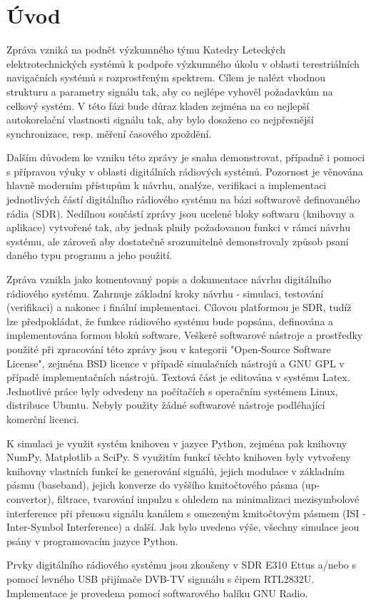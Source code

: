 \section{Úvod}


\marginpar{\textcolor{txt_blue}{Hlavní cíl zprávy}} 
Zpráva vzniká na podnět výzkumného týmu Katedry Leteckých elektrotechnických systémů k podpoře výzkumného úkolu v oblasti terestriálních navigačních systémů s rozprostřeným spektrem. Cílem je nalézt vhodnou strukturu a parametry signálu tak, aby co nejlépe vyhověl požadavkům na celkový systém. V této fázi bude důraz kladen zejména na co nejlepší autokorelační vlastnosti signálu tak, aby bylo dosaženo co nejpřesnější synchronizace, resp. měření časového zpoždění.

\marginpar{\textcolor{txt_blue}{Sekundární cíl zprávy}} 
Dalším důvodem ke vzniku této zprávy je snaha demonstrovat, případně i pomoci s přípravou výuky v oblasti digitálních rádiových systémů. Pozornost je věnována hlavně moderním přístupům k návrhu, analýze, verifikaci a implementaci jednotlivých částí digitálního rádiového systému na bázi softwarově definovaného rádia (SDR). Nedílnou součástí zprávy jsou ucelené bloky softwaru (knihovny a aplikace) vytvořené tak, aby jednak plnily požadovanou funkci v rámci návrhu systému, ale zároveň aby dostatečně srozumitelně demonstrovaly způsob psaní daného typu programu a jeho použití. 

\marginpar{\textcolor{txt_blue}{Použité prostředky}} 
Zpráva vznikla jako komentovaný popis a dokumentace návrhu digitálního rádiového systému. Zahrnuje základní kroky návrhu - simulaci, testování (verifikaci) a nakonec i finální implementaci. Cílovou platformou je SDR, tudíž lze předpokládat, že funkce rádiového systému bude popsána, definována a implementována formou bloků software. Veškeré softwarové nástroje a prostředky použité při zpracování této zprávy jsou v kategorii "Open-Source Software License", zejména BSD licence v případě simulačních nástrojů a GNU GPL v případě implementačních nástrojů. Textová část je editována v systému Latex. Jednotlivé práce byly odvedeny na počítačích s operačním systémem Linux, distribuce Ubuntu. Nebyly použity žádné softwarové nástroje podléhající komerční licenci.

K simulaci je využit systém knihoven v jazyce Python, zejména pak knihovny NumPy, Matplotlib a SciPy. S využitím funkcí těchto knihoven byly vytvořeny knihovny vlastních funkcí ke generování signálů, jejich modulace v základním pásmu (baseband), jejich konverze do vyššího kmitočtového pásma (up-convertor), filtrace, tvarování impulzu s ohledem na minimalizaci mezisymbolové interference při přenosu signálu kanálem s omezeným kmitočtovým pásmem (ISI - Inter-Symbol Interference) a další. Jak bylo uvedeno výše, všechny simulace jsou psány v programovacím jazyce Python.

Prvky digitálního rádiového systému jsou zkoušeny v SDR E310 Ettus a/nebo s pomocí levného USB přijímače DVB-TV signnálu s čipem RTL2832U. Implementace je provedena pomocí softwarového balíku GNU Radio.

%

